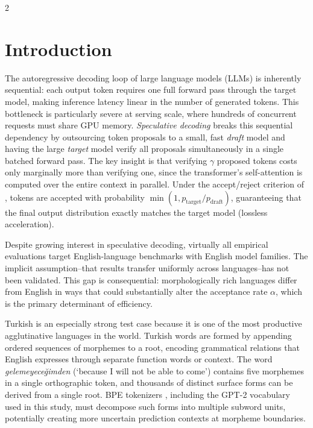 \documentclass[11pt,a4paper]{article}
\begin{document}
\begin{multicols}{2}


\section{Introduction}
\label{sec:intro}

The autoregressive decoding loop of large language models (LLMs) is
inherently sequential: each output token requires one full forward pass
through the target model, making inference latency linear in the number
of generated tokens.
This bottleneck is particularly severe at serving scale, where hundreds of
concurrent requests must share GPU memory.
\emph{Speculative decoding} \citep{leviathan2023fast,chen2023accelerating}
breaks this sequential dependency by outsourcing token proposals to a
small, fast \emph{draft} model and having the large \emph{target} model
verify all proposals simultaneously in a single batched forward pass.
The key insight is that verifying $\gamma$ proposed tokens costs only
marginally more than verifying one, since the transformer's self-attention
is computed over the entire context in parallel.
Under the accept/reject criterion of \citet{leviathan2023fast}, tokens are
accepted with probability $\min(1, p_{\mathrm{target}}/p_{\mathrm{draft}})$,
guaranteeing that the final output distribution exactly matches the target
model (lossless acceleration).

Despite growing interest in speculative decoding, virtually all empirical
evaluations target English-language benchmarks with English model families.
The implicit assumption--that results transfer uniformly across
languages--has not been validated.
This gap is consequential: morphologically rich languages differ from
English in ways that could substantially alter the acceptance rate
$\alpha$, which is the primary determinant of efficiency.

Turkish is an especially strong test case because it is one of the most
productive agglutinative languages in the world.
Turkish words are formed by appending ordered sequences of morphemes
to a root, encoding grammatical relations that English expresses through
separate function words or context.
The word \textit{gelemeyeceğimden} (`because I will not be able to come')
contains five morphemes in a single orthographic token, and thousands of
distinct surface forms can be derived from a single root.
BPE tokenizers \citep{sennrich2016neural}, including the GPT-2 vocabulary
used in this study, must decompose such forms into multiple subword units,
potentially creating more uncertain prediction contexts at morpheme
boundaries.


\end{multicols}
\end{document}
